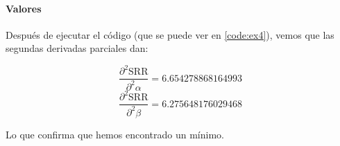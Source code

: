 \paragraph{Valores}

Después de ejecutar el código (que se puede ver en \ref{code:ex4}), vemos que las segundas derivadas parciales dan:

$$ 
\frac{\partial^2 \text{SRR}}{\partial^2 \alpha} = 6.654278868164993 $$
$$
	\frac{\partial^2 \text{SRR}}{\partial^2 \beta} = 6.275648176029468
$$

Lo que confirma que hemos encontrado un mínimo.
